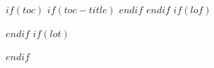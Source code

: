 $if(toc)$
$if(toc-title)$
\renewcommand*\contentsname{$toc-title$}
$endif$
{
\setcounter{tocdepth}{$toc-depth$}
\tableofcontents
}
\newpage
$endif$
$if(lof)$
\listoffigures
$endif$
$if(lot)$
\listoftables
$endif$
